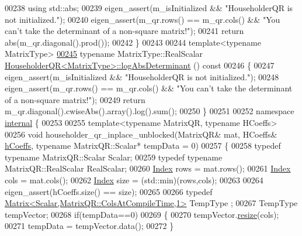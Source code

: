 \begin{DoxyCode}
00238   \textcolor{keyword}{using} std::abs;
00239   eigen\_assert(m\_isInitialized && \textcolor{stringliteral}{"HouseholderQR is not initialized."});
00240   eigen\_assert(m\_qr.rows() == m\_qr.cols() && \textcolor{stringliteral}{"You can't take the determinant of a non-square matrix!"});
00241   \textcolor{keywordflow}{return} abs(m\_qr.diagonal().prod());
00242 \}
00243 
00244 \textcolor{keyword}{template}<\textcolor{keyword}{typename} MatrixType>
\hyperlink{group___q_r___module_af61b6dbef34fc51c825182b16dc43ca1}{00245} \textcolor{keyword}{typename} MatrixType::RealScalar \hyperlink{group___q_r___module_af61b6dbef34fc51c825182b16dc43ca1}{HouseholderQR<MatrixType>::logAbsDeterminant}
      ()\textcolor{keyword}{ const}
00246 \textcolor{keyword}{}\{
00247   eigen\_assert(m\_isInitialized && \textcolor{stringliteral}{"HouseholderQR is not initialized."});
00248   eigen\_assert(m\_qr.rows() == m\_qr.cols() && \textcolor{stringliteral}{"You can't take the determinant of a non-square matrix!"});
00249   \textcolor{keywordflow}{return} m\_qr.diagonal().cwiseAbs().array().log().sum();
00250 \}
00251 
00252 \textcolor{keyword}{namespace }\hyperlink{namespaceinternal}{internal} \{
00253 
00255 \textcolor{keyword}{template}<\textcolor{keyword}{typename} MatrixQR, \textcolor{keyword}{typename} HCoeffs>
00256 \textcolor{keywordtype}{void} householder\_qr\_inplace\_unblocked(MatrixQR& mat, HCoeffs& \hyperlink{group___q_r___module_ae931aa44cde62317b57a9ae661d184be}{hCoeffs}, \textcolor{keyword}{typename} MatrixQR::Scalar* 
      tempData = 0)
00257 \{
00258   \textcolor{keyword}{typedef} \textcolor{keyword}{typename} MatrixQR::Scalar Scalar;
00259   \textcolor{keyword}{typedef} \textcolor{keyword}{typename} MatrixQR::RealScalar RealScalar;
00260   \hyperlink{namespace_eigen_a62e77e0933482dafde8fe197d9a2cfde}{Index} rows = mat.rows();
00261   \hyperlink{namespace_eigen_a62e77e0933482dafde8fe197d9a2cfde}{Index} cols = mat.cols();
00262   \hyperlink{namespace_eigen_a62e77e0933482dafde8fe197d9a2cfde}{Index} size = (std::min)(rows,cols);
00263 
00264   eigen\_assert(hCoeffs.size() == size);
00265 
00266   \textcolor{keyword}{typedef} \hyperlink{group___core___module_class_eigen_1_1_matrix}{Matrix<Scalar,MatrixQR::ColsAtCompileTime,1>} TempType
      ;
00267   TempType tempVector;
00268   \textcolor{keywordflow}{if}(tempData==0)
00269   \{
00270     tempVector.\hyperlink{class_eigen_1_1_plain_object_base_a99d9054ee2d5a40c6e00ded0265e9cea}{resize}(cols);
00271     tempData = tempVector.data();
00272   \}

\end{DoxyCode}
